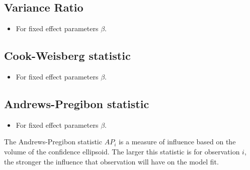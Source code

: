 \documentclass[Main.tex]{subfiles}
\begin{document}
\subsection{Variance Ratio} %
\begin{itemize}
	\item For fixed effect parameters $\beta$.
\end{itemize}

\subsection{Cook-Weisberg statistic} %
\begin{itemize}
	\item For fixed effect parameters $\beta$.
\end{itemize}

\subsection{Andrews-Pregibon statistic} %
\begin{itemize}
	\item For fixed effect parameters $\beta$.
\end{itemize}
The Andrews-Pregibon statistic $AP_{i}$ is a measure of influence based on the volume of the confidence ellipsoid.
The larger this statistic is for observation $i$, the stronger the influence that observation will have on the model fit.



\end{document}
